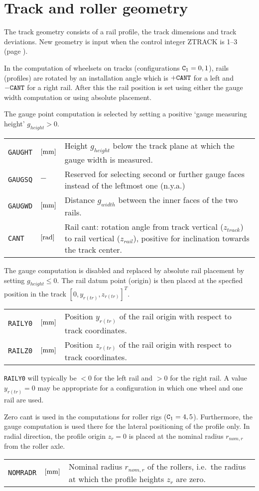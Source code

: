 \documentclass[12pt]{report}
\newenvironment{inputvars}{\vspace{0.4\baselineskip}%

\begin{tabular}{>{\raggedright}p{22mm}p{19mm}p{113mm}}}{
\end{tabular}

}
\newcommand{\inpvar}[3]{{\small\tt #1} & $#2$ & #3 \\[1ex]}
\begin{document}

\section{Track and roller geometry}
\label{sec:track_geom}

The track geometry consists of a rail profile, the track dimensions
and track deviations. New geometry is input when the control integer
ZTRACK is 1--3 (page \pageref{z1-digit}).

In the computation of wheelsets on tracks (configurations ${\tt C}_1=0,
1$), rails (profiles) are rotated by an installation angle which is $+{\tt
CANT}$ for a left and $-{\tt CANT}$ for a right rail. 
After this the rail position is set using either the gauge width
computation or using absolute placement.

The gauge point computation is selected by setting a positive 
`gauge measuring height' $g_{height}>0$.
\begin{inputvars}
\inpvar{GAUGHT}{\bunit{mm}}{Height $g_{height}$ below the track plane at which
        the gauge width is measured.}
\inpvar{GAUGSQ}{-}{Reserved for selecting second or further gauge faces
        instead of the leftmost one (n.y.a.)}
\inpvar{GAUGWD}{\bunit{mm}}{Distance $g_{width}$ between the inner faces of the
        two rails.}
\inpvar{CANT}{\bunit{rad}}{Rail cant: rotation angle from track vertical
        ($z_{track}$) to rail vertical ($z_{rail}$), positive for
        inclination towards the track center.}
\end{inputvars}
The gauge computation is disabled and replaced by absolute rail placement
by setting $g_{height}\le 0$. The rail datum point (origin) is then placed
at the specfied position in the track $[0, y_{r(tr)}, z_{r(tr)}]^T$. 
\begin{inputvars}
\inpvar{RAILY0}{\bunit{mm}}{Position $y_{r(tr)}$ of the rail origin with
        respect to track coordinates.}
\inpvar{RAILZ0}{\bunit{mm}}{Position $z_{r(tr)}$ of the rail origin with
        respect to track coordinates.}
\end{inputvars}
{\tt RAILY0} will typically be $<0$ for the left rail and $>0$ for
the right rail. A value $y_{r(tr)}=0$ may be appropriate for a
configuration in which one wheel and one rail are used.

Zero cant is used in the computations for roller rigs (${\tt C}_1=4,5$).
Furthermore, the gauge computation is used there for the lateral
positioning of the profile only. In radial direction, the profile origin
$z_r=0$ is placed at the nominal radius $r_{nom,r}$ from the roller axle.
\begin{inputvars}
\inpvar{NOMRADR}{\bunit{mm}}{Nominal radius $r_{nom,r}$ of the rollers, i.e.\ the
        radius at which the profile heights $z_r$ are zero.}
\end{inputvars}
\end{document}
